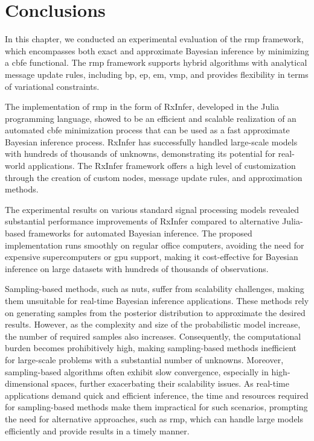 \section{Conclusions}\label{chapter-05:section:conclusion}

In this chapter, we conducted an experimental evaluation of the \ac{rmp} framework, 
which encompasses both exact and approximate Bayesian inference by
minimizing a \ac{cbfe} functional.
The \ac{rmp} framework supports hybrid algorithms with analytical message update rules, including
\ac{bp}, \ac{ep}, \ac{em}, \ac{vmp}, and provides flexibility in terms of variational constraints.

The implementation of \ac{rmp} in the form of RxInfer, developed in the Julia programming language,
showed to be an efficient and scalable realization of an automated \ac{cbfe} minimization process that can be used
as a fast approximate Bayesian inference process.
RxInfer has successfully handled large-scale models with hundreds of thousands of unknowns,
demonstrating its potential for real-world applications.
The RxInfer framework offers a high level of customization through the creation of custom
nodes, message update rules, and approximation methods.

The experimental results on various standard signal processing models revealed substantial
performance improvements of RxInfer compared to alternative Julia-based frameworks for automated Bayesian inference.
The proposed implementation runs smoothly on regular office computers, avoiding the need for
expensive supercomputers or \ac{gpu} support, making it cost-effective for Bayesian inference on
large datasets with hundreds of thousands of observations.

Sampling-based methods, such as \ac{nuts}, suffer from
scalability challenges, making them unsuitable for real-time Bayesian inference applications.
These methods rely on generating samples from the posterior distribution to approximate the
desired results.
However, as the complexity and size of the probabilistic model increase, the number of
required samples also increases.
Consequently, the computational burden becomes prohibitively high, making sampling-based
methods inefficient for large-scale problems with a substantial number of unknowns.
Moreover, sampling-based algorithms often exhibit slow convergence, especially in high-dimensional
spaces, further exacerbating their scalability issues.
As real-time applications demand quick and efficient inference, the time and resources
required for sampling-based methods make them impractical for such scenarios, prompting the
need for alternative approaches, such as \ac{rmp}, which can handle large models
efficiently and provide results in a timely manner.

